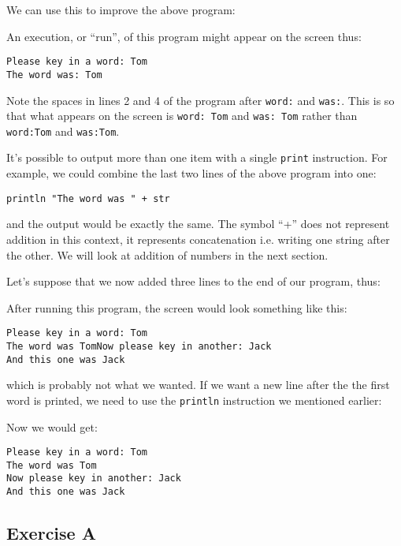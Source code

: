 We can use this to improve the above program:


An execution, or ``run'', of this program might appear on the screen thus:
\begin{Verbatim}
Please key in a word: Tom
The word was: Tom
\end{Verbatim}

Note the spaces in lines 2 and 4 of the program after \verb!word:! and \verb!was:!.
This is so that what appears on the screen is \verb!word: Tom! and
\verb!was: Tom! rather than \verb!word:Tom! and \verb!was:Tom!.

It's possible to output more than one item with a single \verb!print! instruction.
For example, we could combine the last two lines of the above program into one:

\begin{Verbatim}
println "The word was " + str
\end{Verbatim}

and the output would be exactly the same. The symbol ``+'' does not
represent addition in this context, it represents concatenation i.e. 
writing one string after the other. We will look at addition of numbers in the next section.

Let's suppose that we now added three lines to the end of our program, thus:


After running this program, the screen would look something like this:
\begin{Verbatim}
Please key in a word: Tom
The word was TomNow please key in another: Jack
And this one was Jack
\end{Verbatim}

which is probably not what we wanted.  If we want a new line after the
the first word is printed, we need to use the \verb!println! instruction we mentioned earlier:


Now we would get:
\begin{Verbatim}
Please key in a word: Tom
The word was Tom
Now please key in another: Jack
And this one was Jack
\end{Verbatim}


\subsection*{Exercise A}

